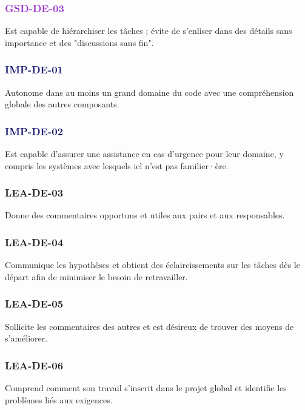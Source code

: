 \documentclass[a4paper, french, openany, 12pt]{book}
\newcommand\str[1]{\textcolor{DarkOrchid}{\textbf{\uppercase{gsd-{#1}}}}}
\newcommand\wis[1]{\textcolor{MidnightBlue}{\textbf{\uppercase{imp-{#1}}}}}
\newcommand\cha[1]{\textcolor{OliveGreen}{\textbf{\uppercase{lea-{#1}}}}}
\begin{document}
\begin{multicols}{2}
  \subsubsection*{\str{de-03}}

  Est capable de hiérarchiser les tâches ; évite de s'enliser dans des détails sans importance et des "discussions sans 
  fin".

  \subsubsection*{\wis{de-01}}

  Autonome dans au moins un grand domaine du code avec une compréhension globale des autres composants.

  \subsubsection*{\wis{de-02}}

  Est capable d'assurer une assistance en cas d'urgence pour leur domaine, y compris les systèmes avec lesquels iel 
  n'est pas familier·ère.

  \subsubsection*{\cha{de-03}}

  Donne des commentaires opportuns et utiles aux pairs et aux responsables.

  \subsubsection*{\cha{de-04}}

  Communique les hypothèses et obtient des éclaircissements sur les tâches dès le départ afin de minimiser le besoin de 
  retravailler.

  \subsubsection*{\cha{de-05}}

  Sollicite les commentaires des autres et est désireux de trouver des moyens de s'améliorer.

  \subsubsection*{\cha{de-06}}

  Comprend comment son travail s'inscrit dans le projet global et identifie les problèmes liés aux exigences.

\end{multicols}
\end{document}
